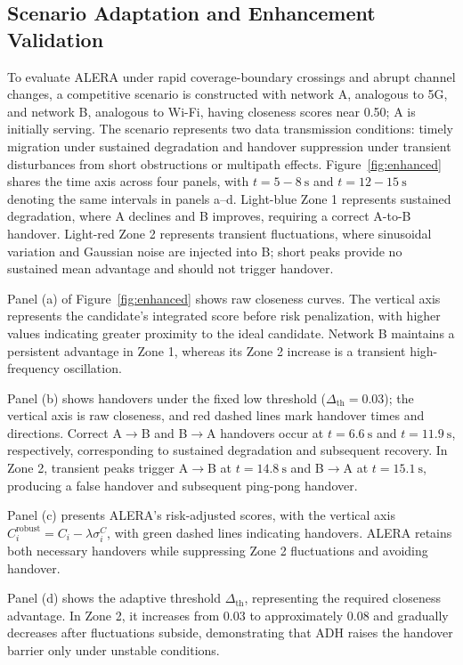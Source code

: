\documentclass[final,3p,times,twocolumn]{elsarticle}
\begin{document}
\subsection{Scenario Adaptation and Enhancement Validation}\label{sec:adapt}

To evaluate ALERA under rapid coverage-boundary crossings and abrupt channel changes, a competitive scenario is constructed with network A, analogous to 5G, and network B, analogous to Wi-Fi, having closeness scores near 0.50; A is initially serving. The scenario represents two data transmission conditions: timely migration under sustained degradation and handover suppression under transient disturbances from short obstructions or multipath effects. Figure~\ref{fig:enhanced} shares the time axis across four panels, with $t=5-8~\mathrm{s}$ and $t=12-15~\mathrm{s}$ denoting the same intervals in panels a--d. Light-blue Zone 1 represents sustained degradation, where A declines and B improves, requiring a correct A-to-B handover. Light-red Zone 2 represents transient fluctuations, where sinusoidal variation and Gaussian noise are injected into B; short peaks provide no sustained mean advantage and should not trigger handover.

Panel (a) of Figure~\ref{fig:enhanced} shows raw closeness curves. The vertical axis represents the candidate's integrated score before risk penalization, with higher values indicating greater proximity to the ideal candidate. Network B maintains a persistent advantage in Zone 1, whereas its Zone 2 increase is a transient high-frequency oscillation.

Panel (b) shows handovers under the fixed low threshold ($\Delta_{\mathrm{th}}=0.03$); the vertical axis is raw closeness, and red dashed lines mark handover times and directions. Correct A$\rightarrow$B and B$\rightarrow$A handovers occur at $t=6.6~\mathrm{s}$ and $t=11.9~\mathrm{s}$, respectively, corresponding to sustained degradation and subsequent recovery. In Zone 2, transient peaks trigger A$\rightarrow$B at $t=14.8~\mathrm{s}$ and B$\rightarrow$A at $t=15.1~\mathrm{s}$, producing a false handover and subsequent ping-pong handover.

Panel (c) presents ALERA's risk-adjusted scores, with the vertical axis $C_i^{\mathrm{robust}}=C_i-\lambda\sigma_i^C$, with green dashed lines indicating handovers. ALERA retains both necessary handovers while suppressing Zone 2 fluctuations and avoiding handover.

Panel (d) shows the adaptive threshold $\Delta_{\mathrm{th}}$, representing the required closeness advantage. In Zone 2, it increases from 0.03 to approximately 0.08 and gradually decreases after fluctuations subside, demonstrating that ADH raises the handover barrier only under unstable conditions.
\end{document}

